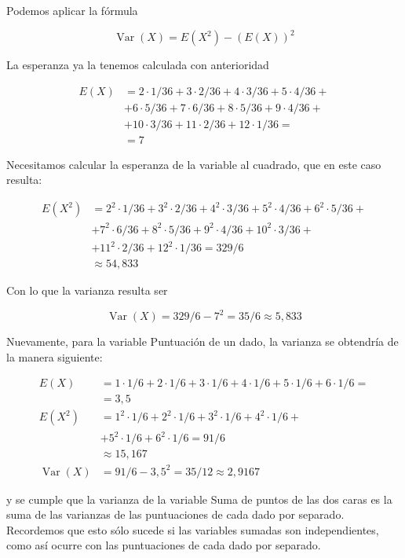 \documentclass[
]{article}
\begin{document}
Podemos aplicar la fórmula

\[
\operatorname{Var}(X)=E\left(X^{2}\right)-(E(X))^{2}
\]

La esperanza ya la tenemos calculada con anterioridad

\[
\begin{aligned}
E(X) & =2 \cdot 1 / 36+3 \cdot 2 / 36+4 \cdot 3 / 36+5 \cdot 4 / 36+\\
& +6 \cdot 5 / 36+7 \cdot 6 / 36+8 \cdot 5 / 36+9 \cdot 4 / 36+\\
& +10 \cdot 3 / 36+ 11 \cdot 2 / 36+12 \cdot 1 / 36=\\
& =7
\end{aligned}
\]

Necesitamos calcular la esperanza de la variable al cuadrado, que en
este caso resulta:

\[
\begin{aligned}
E\left(X^{2}\right)& =2^{2} \cdot 1 / 36+3^{2} \cdot 2 / 36+4^{2} \cdot 3 / 36+5^{2} \cdot 4 / 36+6^{2} \cdot 5 / 36+\\
& + 7^{2} \cdot 6 / 36+8^{2} \cdot 5 / 36+9^{2} \cdot 4 / 36+  10^{2} \cdot 3 / 36+\\
& + 11^{2} \cdot 2 / 36+12^{2} \cdot 1 / 36=329 / 6 \\
&\approx 54,833
\end{aligned}
\]

Con lo que la varianza resulta ser

\[
\operatorname{Var}(X)=329 / 6-7^{2}=35 / 6 \approx 5,833
\]

Nuevamente, para la variable Puntuación de un dado, la varianza se
obtendría de la manera siguiente:

\[
\begin{aligned}
E(X)& =1 \cdot 1 / 6+2 \cdot 1 / 6+3 \cdot 1 / 6+4 \cdot 1 / 6+5 \cdot 1 / 6+6 \cdot 1 / 6= \\& =3,5\\
E \left(X^{2}\right)&=1^{2} \cdot 1 / 6+2^{2} \cdot 1 / 6+3^{2} \cdot 1 / 6+4^{2} \cdot 1 / 6+\\
& + 5^{2} \cdot 1 / 6+6^{2} \cdot 1 / 6=91 / 6\\ &  \approx 15,167 \\
\operatorname{Var}(X)&=91 / 6-3,5^{2}=35 / 12 \approx 2,9167
\end{aligned}
\]

y se cumple que la varianza de la variable Suma de puntos de las dos
caras es la suma de las varianzas de las puntuaciones de cada dado por separado. Recordemos que esto sólo sucede si las variables sumadas son independientes, como así ocurre con las puntuaciones de cada dado por separado.
\end{document}
